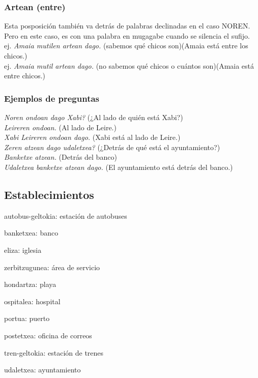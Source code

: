 \documentclass[11pt, a4paper]{article}
\begin{document}
\subsubsection{Artean (entre)}
Esta posposición también va detrás de palabras declinadas en el caso NOREN. Pero en este caso, es con una palabra en mugagabe cuando se silencia el sufijo.\\
\indent ej. \textit{Amaia mutilen artean dago.} (sabemos qué chicos son)(Amaia está entre los chicos.)\\
\indent ej. \textit{Amaia mutil artean dago.} (no sabemos qué chicos o cuántos son)(Amaia está entre chicos.)

\subsubsection{Ejemplos de preguntas}
\textit{Noren ondoan dago Xabi?} (¿Al lado de quién está Xabi?)\\
\textit{Leireren ondoan.}
(Al lado de Leire.)\\
\textit{Xabi Leireren ondoan dago.}
(Xabi está al lado de Leire.)\\

\noindent \textit{Zeren atzean dago udaletxea?}
(¿Detrás de qué está el ayuntamiento?)\\
\textit{Banketxe atzean.}
(Detrás del banco)\\
\textit{Udaletxea banketxe atzean dago.}
(El ayuntamiento está detrás del banco.)

\subsection{Establecimientos}
\begin{itemize}
\begin{multicols}{2}
\item autobus-geltokia: estación de autobuses
\item banketxea: banco
\item eliza: iglesia
\item zerbitzugunea: área de servicio
\item hondartza: playa
\item ospitalea: hospital
\item portua: puerto
\item postetxea: oficina de correos
\item tren-geltokia: estación de trenes
\item udaletxea: ayuntamiento
\end{multicols}
\end{itemize}
\end{document}
